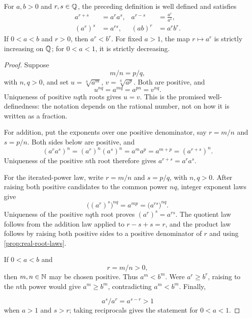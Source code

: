 \begin{theorem}
\label{lem:rational-power-laws}
For \(a,b>0\) and \(r,s\in\mathbb{Q}\), the preceding definition is well defined
and satisfies
\[
\begin{aligned}
a^{r+s}&=a^ra^s,&
a^{r-s}&=\frac{a^r}{a^s},\\
(a^r)^s&=a^{rs},&
(ab)^r&=a^rb^r.
\end{aligned}
\]
If \(0<a<b\) and \(r>0\), then \(a^r<b^r\). For fixed \(a>1\), the map
\(r\mapsto a^r\) is strictly increasing on \(\mathbb{Q}\); for \(0<a<1\), it is
strictly decreasing.
\end{theorem}
\begin{proof}
Suppose
\[
m/n=p/q,
\]
 with \(n,q>0\), and set
\(u=\sqrt[n]{a^m}\), \(v=\sqrt[q]{a^p}\). Both are positive, and
\[
u^{nq}=a^{mq}=a^{pn}=v^{nq}.
\]
Uniqueness of positive \(nq\)th roots gives \(u=v\). This is the promised
well-definedness: the notation depends on the rational number, not on how it
is written as a fraction.

For addition, put the exponents over one positive denominator,
say $r=m/n$ and $s=p/n$. Both sides below are positive, and
\[
(a^ra^s)^n=(a^r)^n(a^s)^n=a^ma^p=a^{m+p}
                 =(a^{r+s})^n.
\]
Uniqueness of the positive $n$th root therefore gives
$a^{r+s}=a^ra^s$.

For the iterated-power law, write $r=m/n$ and $s=p/q$, with $n,q>0$.
After raising both positive candidates to the common power $nq$, integer
exponent laws give
\[
\bigl((a^r)^s\bigr)^{nq}=a^{mp}
               =\bigl(a^{rs}\bigr)^{nq}.
\]
Uniqueness of the positive $nq$th root proves $(a^r)^s=a^{rs}$.
The quotient law follows from the addition law applied to $r-s+s=r$, and
the product law follows by raising both positive sides to a positive
denominator of $r$ and using \cref{prop:real-root-laws}.

If \(0<a<b\) and
\[
r=m/n>0,
\]
 then \(m,n\in\mathbb{N}\) may be chosen positive.
Thus \(a^m<b^m\). Were \(a^r\geq b^r\), raising to the \(n\)th power would
give \(a^m\geq b^m\), contradicting \(a^m<b^m\). Finally,

\[
a^s/a^r=a^{s-r}>1
\]
 when \(a>1\) and \(s>r\); taking reciprocals gives
the statement for \(0<a<1\).
\end{proof}

